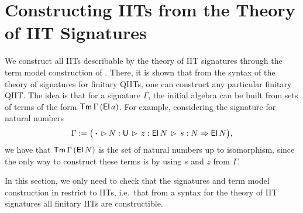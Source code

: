 \documentclass[a4paper,UKenglish,cleveref, autoref]{lipics-v2019}
\begin{document}







\section{Constructing IITs from the Theory of IIT Signatures}
\label{sec:constructingiits}

We construct all IITs describable by the theory of IIT signatures through the
term model construction of \cite{Kaposi:2019:CQI:3302515.3290315}. There, it is
shown that from the syntax of the theory of signatures for finitary QIITs, one
can construct any particular finitary QIIT. The idea is that for a signature
$\Gamma$, the initial algebra can be built from sets of terms of the form
$\mathsf{Tm}\,\Gamma\,(\mathsf{El}\,a)$. For example, considering the signature for natural
numbers
\[
  \Gamma := \big(\boldsymbol{\cdot}\,\rhd\,N:\mathsf{U}\,\rhd\,z : \mathsf{El}\,N\,\rhd\,s : N \Rightarrow \mathsf{El}\,N\big),
\]
we have that $\mathsf{Tm}\,\Gamma\,(\mathsf{El}\,N)$ is the set of natural numbers up to isomorphism,
since the only way to construct these terms is by using $s$ and $z$ from $\Gamma$.

In this section, we only need to check that the signatures and term model
construction in \cite{Kaposi:2019:CQI:3302515.3290315} restrict to IITs,
i.e.\ that from a syntax for the theory of IIT signatures all finitary IITs are
constructible.
\end{document}
